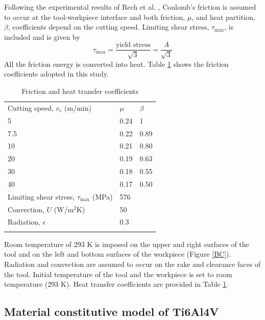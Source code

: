 \documentclass[preprint,12pt,times]{elsarticle}
\begin{document}
Following the experimental results of Rech et al. \cite{rech_Characterisation_2013}, Coulomb's friction is assumed to occur at the tool-workpiece interface and both friction, $\mu$, and heat partition, $\beta$, coefficients depend on the cutting speed. Limiting shear stress, $\tau_{\text{max}}$, is included and is given by
%
\begin{equation}
\tau_{\text{max}} = \frac{\text{yield stress}}{\sqrt{3}} = \frac{A}{\sqrt{3}}
\end{equation}
%
All the friction energy is converted into heat. Table \ref{tab:fricHeat} shows the friction coefficients adopted in this study.
%
\begin{table}[!h]
\begin{center}
\caption{\label{tab:fricHeat} Friction and heat transfer coefficients \cite{rech_Characterisation_2013, _GRANTA_2020}}
\begin{tabular}{lll}
\hline\noalign{\smallskip}
Cutting speed, $v_c$ (m/min) & $\mu$ & $\beta$\\
5 & 0.24 & 1\\
7.5 & 0.22 & 0.89\\
10 & 0.21 & 0.80\\
20 & 0.19 & 0.63\\
30 & 0.18 & 0.55\\
40 & 0.17 & 0.50\\
\noalign{\smallskip}\hline\noalign{\smallskip}
Limiting shear stress, $\tau_{\text{max}}$ (MPa) & 576\\
Convection, $U$ (W/m$^2$K) & 50\\
Radiation, $\epsilon$ & 0.3\\
\noalign{\smallskip}\hline\noalign{\smallskip}
\end{tabular}
\end{center}
\end{table}
%

Room temperature of 293 K is imposed on the upper and right surfaces of the tool and on the left and bottom surfaces of the workpiece (Figure \ref{BC}). Radiation and convection are assumed to occur on the rake and clearance faces of the tool. Initial temperature of the tool and the workpiece is set to room temperature (293 K). Heat transfer coefficients are provided in Table \ref{tab:fricHeat}.

\subsection{Material constitutive model of Ti6Al4V}
\end{document}
